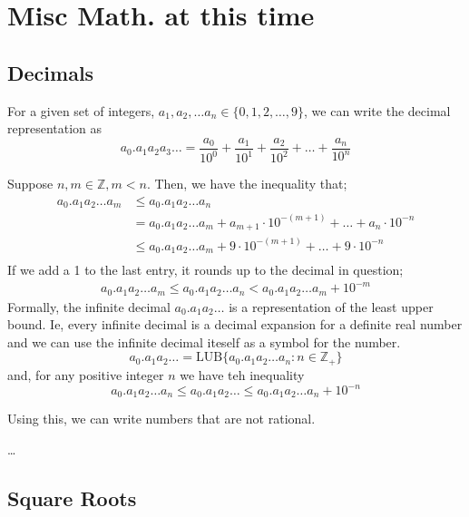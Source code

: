 \section{Misc Math. at this time}

\subsection{Decimals}
For a given set of integers, $a_1, a_2, \dots a_n \in \{0, 1, 2, \dots, 9\}$, we can write the decimal representation as \[a_0.a_1a_2a_3\dots = \frac{a_0}{10^0} +\frac{a_1}{10^1} + \frac{a_2}{10^2} + \dots + \frac{a_n}{10^n}\]

Suppose $n, m \in \mathbb{Z}, m < n$. Then, we have the inequality that;
\begin{align*}
    a_0.a_1a_2\dots a_m &\leq a_0.a_1a_2\dots a_n \\
    &= a_0.a_1a_2\dots a_m + a_{m+1} \cdot 10^{-(m+1)} + \dots + a_n \cdot 10^{-n} \\
    &\leq a_0.a_1a_2\dots a_m + 9 \cdot 10^{-(m+1)} + \dots + 9 \cdot 10^{-n} \\
\end{align*}
If we add a 1 to the last entry, it rounds up to the decimal in question;
\begin{align*}
    a_0.a_1a_2\dots a_m \leq  a_0.a_1a_2\dots a_n < a_0.a_1a_2\dots a_m + 10^{-m} 
\end{align*}
Formally, the infinite decimal $a_0.a_1a_2\dots$ is a representation of the least upper bound. Ie, every infinite decimal is a decimal expansion for a definite real number and we can use the infinite decimal iteself as a symbol for the number. 
\begin{equation}
    a_0.a_1a_2\dots = \text{LUB}\{a_0.a_1a_2\dots a_n : n \in \mathbb{Z}_+\}
 \end{equation}
and, for any positive integer $n$ we have teh inequality
\[
a_0.a_1a_2\dots a_n \leq a_0.a_1a_2\dots \leq  a_0.a_1a_2\dots a_n + 10^{-n}
\]

Using this, we can write numbers that are not rational.

\dots

\subsection{Square Roots}

